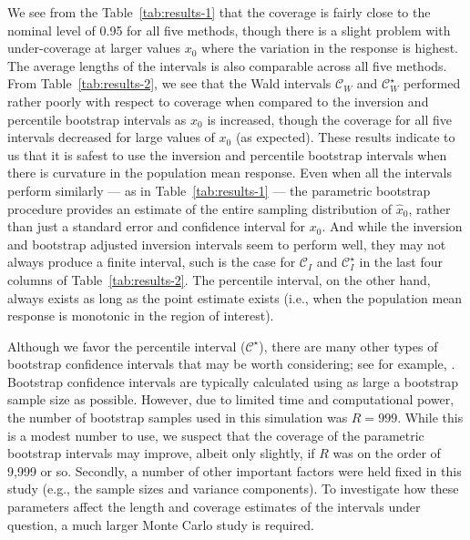\documentclass[useAMS,usenatbib,usegraphicx,referee]{biom}\usepackage[]{graphicx}\usepackage[]{color}
\newcommand{\boot}{\star}
\begin{document}
We see from the Table~\ref{tab:results-1} that the coverage is fairly close to the nominal level of 0.95 for all five methods, though there is a slight problem with under-coverage at larger values $x_0$ where the variation in the response is highest. The average lengths of the intervals is also comparable across all five methods. From Table~\ref{tab:results-2}, we see that the Wald intervals $\mathcal{C}_W$ and $\mathcal{C}^\boot_W$ performed rather poorly with respect to coverage when compared to the inversion and percentile bootstrap intervals as $x_0$ is increased, though the coverage for all five intervals decreased for large values of $x_0$ (as expected). These results indicate to us that it is safest to use the inversion and percentile bootstrap intervals when there is curvature in the population mean response. Even when all the intervals perform similarly --- as in Table~\ref{tab:results-1} --- the parametric bootstrap procedure provides an estimate of the entire sampling distribution of $\widehat{x}_0$, rather than just a standard error and confidence interval for $x_0$. And while the inversion and bootstrap adjusted inversion intervals seem to perform well, they may not always produce a finite interval, such is the case for $\mathcal{C}_I$ and $\mathcal{C}^\boot_I$ in the last four columns of Table~\ref{tab:results-2}. The percentile interval, on the other hand, always exists as long as the point estimate exists (i.e., when the population mean response is monotonic in the region of interest).

Although we favor the percentile interval ($\mathcal{C}^\boot$), there are many other types of bootstrap confidence intervals that may be worth considering; see for example, \citet[chap. 5]{davison_bootstrap_1997}. Bootstrap confidence intervals are typically calculated using as large a bootstrap sample size as possible. However, due to limited time and computational power, the number of bootstrap samples used in this simulation was $R = 999$. While this is a modest number to use, we suspect that the coverage of the parametric bootstrap intervals may improve, albeit only slightly, if $R$ was on the order of 9,999 or so. Secondly, a number of other important factors were held fixed in this study (e.g., the sample sizes and variance components). To investigate how these parameters affect the length and coverage estimates of the intervals under question, a much larger Monte Carlo study is required. 
\end{document}
